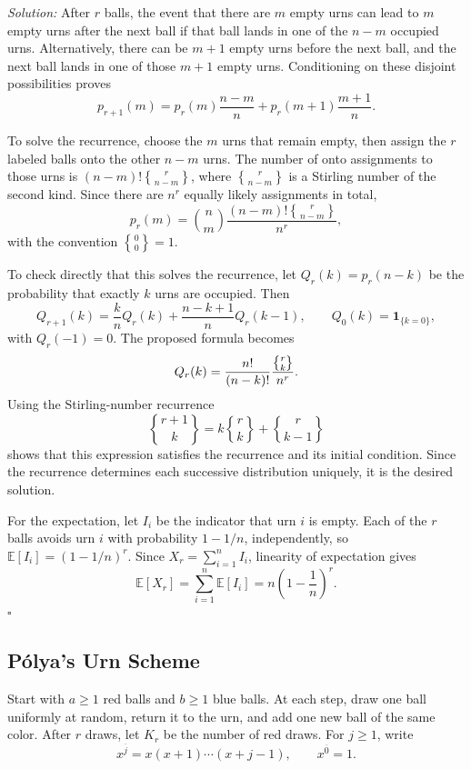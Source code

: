 \documentclass[a4paper,11pt,abstracton]{scrartcl}
\newcommand{\genstirlingII}[3]{%
  \genfrac{\{}{\}}{0pt}{#1}{#2}{#3}%
}
\newcommand{\stirlingII}[2]{\genstirlingII{}{#1}{#2}}
\theoremstyle{dotlessP}
\theoremstyle{dotlessS}
\theoremstyle{remark}
\theoremstyle{definition}
\begin{document}
\begin{claim_box}
\textit{Solution:} After $r$ balls, the event that there are $m$ empty urns can lead to $m$ empty urns after the next ball if that ball lands in one of the $n-m$ occupied urns. Alternatively, there can be $m+1$ empty urns before the next ball, and the next ball lands in one of those $m+1$ empty urns. Conditioning on these disjoint possibilities proves
\[
  p_{r+1}(m)
  =p_r(m)\frac{n-m}{n}+p_r(m+1)\frac{m+1}{n}.
\]

To solve the recurrence, choose the $m$ urns that remain empty, then assign the $r$ labeled balls onto the other $n-m$ urns. The number of onto assignments to those urns is $(n-m)!\stirlingII{r}{n-m}$, where $\stirlingII{r}{n-m}$ is a Stirling number of the second kind. Since there are $n^r$ equally likely assignments in total,
\[
  p_r(m)=\binom{n}{m}\frac{(n-m)!\stirlingII{r}{n-m}}{n^r},
\]
with the convention $\stirlingII{0}{0}=1$.

To check directly that this solves the recurrence, let $Q_r(k)=p_r(n-k)$ be the probability that exactly $k$ urns are occupied. Then
\[
  Q_{r+1}(k)=\frac{k}{n}Q_r(k)+\frac{n-k+1}{n}Q_r(k-1),
  \qquad Q_0(k)=\mathbf{1}_{\{k=0\}},
\]
with $Q_r(-1)=0$. The proposed formula becomes
\[
  Q_r(k)=\frac{n!}{(n-k)!}\frac{\stirlingII{r}{k}}{n^r}.
\]
Using the Stirling-number recurrence
\[
  \stirlingII{r+1}{k}=k\stirlingII{r}{k}+\stirlingII{r}{k-1}
\]
shows that this expression satisfies the recurrence and its initial condition. Since the recurrence determines each successive distribution uniquely, it is the desired solution.

For the expectation, let $I_i$ be the indicator that urn $i$ is empty. Each of the $r$ balls avoids urn $i$ with probability $1-1/n$, independently, so $\mathbb{E}[I_i]=(1-1/n)^r$. Since $X_r=\sum_{i=1}^n I_i$, linearity of expectation gives
\[
  \mathbb{E}[X_r]=\sum_{i=1}^n\mathbb{E}[I_i]
  =n\left(1-\frac{1}{n}\right)^r.
\]
\hfill$\square$
\end{claim_box}

\subsection{P\'olya's Urn Scheme}

Start with $a\geq1$ red balls and $b\geq1$ blue balls. At each step, draw one ball uniformly at random, return it to the urn, and add one new ball of the same color. After $r$ draws, let $K_r$ be the number of red draws. For $j\geq1$, write
\[
  x^{\overline{j}}=x(x+1)\cdots(x+j-1),
  \qquad x^{\overline{0}}=1.
\]
\end{document}
